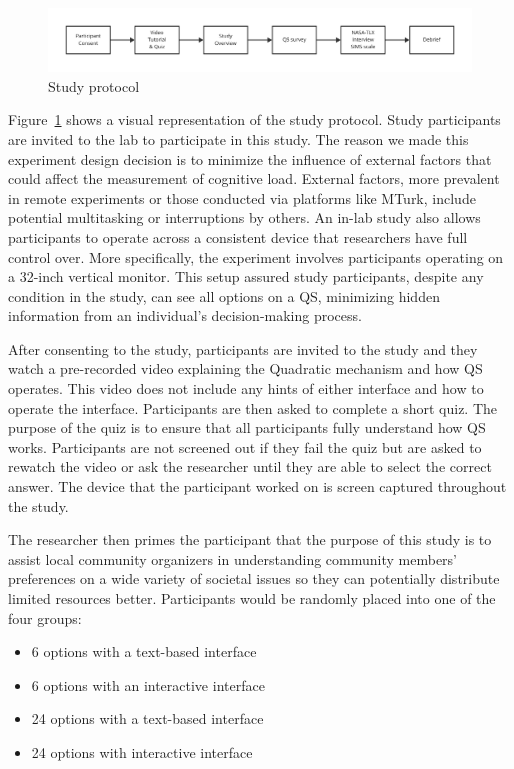 \begin{figure}[h]
    \centering
    \includegraphics[width=1\textwidth]{content/image/study_flow.pdf}
    \caption{Study protocol}
    \label{fig:studyProtocol}
\end{figure}

Figure~\ref{fig:studyProtocol} shows a visual representation of the study protocol. Study participants are invited to the lab to participate in this study. The reason we made this experiment design decision is to minimize the influence of external factors that could affect the measurement of cognitive load. External factors, more prevalent in remote experiments or those conducted via platforms like MTurk, include potential multitasking or interruptions by others. An in-lab study also allows participants to operate across a consistent device that researchers have full control over. More specifically, the experiment involves participants operating on a 32-inch vertical monitor. This setup assured study participants, despite any condition in the study, can see all options on a QS, minimizing hidden information from an individual's decision-making process.

After consenting to the study, participants are invited to the study and they watch a pre-recorded video explaining the Quadratic mechanism and how QS operates. This video does not include any hints of either interface and how to operate the interface. Participants are then asked to complete a short quiz. The purpose of the quiz is to ensure that all participants fully understand how QS works. Participants are not screened out if they fail the quiz but are asked to rewatch the video or ask the researcher until they are able to select the correct answer. The device that the participant worked on is screen captured throughout the study.

The researcher then primes the participant that the purpose of this study is to assist local community organizers in understanding community members' preferences on a wide variety of societal issues so they can potentially distribute limited resources better. Participants would be randomly placed into one of the four groups:

\begin{itemize}
    \item 6 options with a text-based interface
    \item 6 options with an interactive interface
    \item 24 options with a text-based interface
    \item 24 options with interactive interface
\end{itemize}

